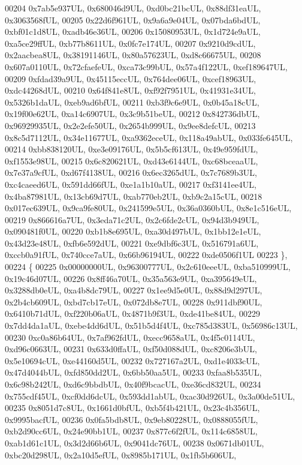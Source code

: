 \begin{DoxyCode}
00204     0x7ab5e937UL, 0x680046d9UL, 0xd0bc21bcUL, 0x88df31eaUL, 0x3063568fUL,
00205     0x22d6f961UL, 0x9a6a9e04UL, 0x07bda6bdUL, 0xbf01c1d8UL, 0xadb46e36UL,
00206     0x15080953UL, 0x1d724e9aUL, 0xa5ce29ffUL, 0xb77b8611UL, 0x0fc7e174UL,
00207     0x9210d9cdUL, 0x2aacbea8UL, 0x38191146UL, 0x80a57623UL, 0xd8c66675UL,
00208     0x607a0110UL, 0x72cfaefeUL, 0xca73c99bUL, 0x57a4f122UL, 0xef189647UL,
00209     0xfdad39a9UL, 0x45115eccUL, 0x764dee06UL, 0xcef18963UL, 0xdc44268dUL,
00210     0x64f841e8UL, 0xf92f7951UL, 0x41931e34UL, 0x5326b1daUL, 0xeb9ad6bfUL,
00211     0xb3f9c6e9UL, 0x0b45a18cUL, 0x19f00e62UL, 0xa14c6907UL, 0x3c9b51beUL,
00212     0x842736dbUL, 0x96929935UL, 0x2e2efe50UL, 0x2654b999UL, 0x9ee8defcUL,
00213     0x8c5d7112UL, 0x34e11677UL, 0xa9362eceUL, 0x118a49abUL, 0x033fe645UL,
00214     0xbb838120UL, 0xe3e09176UL, 0x5b5cf613UL, 0x49e959fdUL, 0xf1553e98UL,
00215     0x6c820621UL, 0xd43e6144UL, 0xc68bceaaUL, 0x7e37a9cfUL, 0xd67f4138UL,
00216     0x6ec3265dUL, 0x7c7689b3UL, 0xc4caeed6UL, 0x591dd66fUL, 0xe1a1b10aUL,
00217     0xf3141ee4UL, 0x4ba87981UL, 0x13cb69d7UL, 0xab770eb2UL, 0xb9c2a15cUL,
00218     0x017ec639UL, 0x9ca9fe80UL, 0x241599e5UL, 0x36a0360bUL, 0x8e1c516eUL,
00219     0x866616a7UL, 0x3eda71c2UL, 0x2c6fde2cUL, 0x94d3b949UL, 0x090481f0UL,
00220     0xb1b8e695UL, 0xa30d497bUL, 0x1bb12e1eUL, 0x43d23e48UL, 0xfb6e592dUL,
00221     0xe9dbf6c3UL, 0x516791a6UL, 0xccb0a91fUL, 0x740cce7aUL, 0x66b96194UL,
00222     0xde0506f1UL
00223   \},
00224   \{
00225     0x00000000UL, 0x96300777UL, 0x2c610eeeUL, 0xba510999UL, 0x19c46d07UL,
00226     0x8ff46a70UL, 0x35a563e9UL, 0xa395649eUL, 0x3288db0eUL, 0xa4b8dc79UL,
00227     0x1ee9d5e0UL, 0x88d9d297UL, 0x2b4cb609UL, 0xbd7cb17eUL, 0x072db8e7UL,
00228     0x911dbf90UL, 0x6410b71dUL, 0xf220b06aUL, 0x4871b9f3UL, 0xde41be84UL,
00229     0x7dd4da1aUL, 0xebe4dd6dUL, 0x51b5d4f4UL, 0xc785d383UL, 0x56986c13UL,
00230     0xc0a86b64UL, 0x7af962fdUL, 0xecc9658aUL, 0x4f5c0114UL, 0xd96c0663UL,
00231     0x633d0ffaUL, 0xf50d088dUL, 0xc8206e3bUL, 0x5e10694cUL, 0xe44160d5UL,
00232     0x727167a2UL, 0xd1e4033cUL, 0x47d4044bUL, 0xfd850dd2UL, 0x6bb50aa5UL,
00233     0xfaa8b535UL, 0x6c98b242UL, 0xd6c9bbdbUL, 0x40f9bcacUL, 0xe36cd832UL,
00234     0x755cdf45UL, 0xcf0dd6dcUL, 0x593dd1abUL, 0xac30d926UL, 0x3a00de51UL,
00235     0x8051d7c8UL, 0x1661d0bfUL, 0xb5f4b421UL, 0x23c4b356UL, 0x9995bacfUL,
00236     0x0fa5bdb8UL, 0x9eb80228UL, 0x0888055fUL, 0xb2d90cc6UL, 0x24e90bb1UL,
00237     0x877c6f2fUL, 0x114c6858UL, 0xab1d61c1UL, 0x3d2d66b6UL, 0x9041dc76UL,
00238     0x0671db01UL, 0xbc20d298UL, 0x2a10d5efUL, 0x8985b171UL, 0x1fb5b606UL,

\end{DoxyCode}
